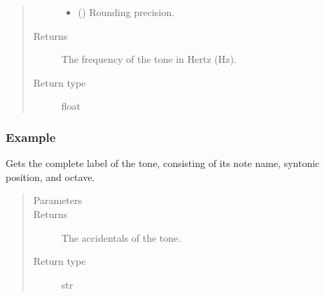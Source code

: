 \documentclass[letterpaper,10pt,english]{sphinxmanual}
\begin{document}
\begin{fulllineitems}
\begin{fulllineitems}
\begin{quote}
\begin{description}
\begin{itemize}
\item {} 
\sphinxAtStartPar
{} () \textendash{} Rounding precision.

\end{itemize}

\item[{Returns}] \leavevmode
\sphinxAtStartPar
The frequency of the tone in Hertz (Hz).

\item[{Return type}] \leavevmode
\sphinxAtStartPar
float

\end{description}\end{quote}
\subsubsection*{Example}

\begin{sphinxVerbatim}[commandchars=\\\{\}]
  
\end{sphinxVerbatim}

\end{fulllineitems}



\begin{fulllineitems}
\sphinxAtStartPar
Gets the complete label of the tone, consisting of its note name, syntonic position, and octave.
\begin{quote}\begin{description}
\item[{Parameters}] \leavevmode
\sphinxAtStartPar
{} \textendash{} 

\item[{Returns}] \leavevmode
\sphinxAtStartPar
The accidentals of the tone.

\item[{Return type}] \leavevmode
\sphinxAtStartPar
str

\end{description}\end{quote}

\end{fulllineitems}
\end{fulllineitems}
\end{document}
